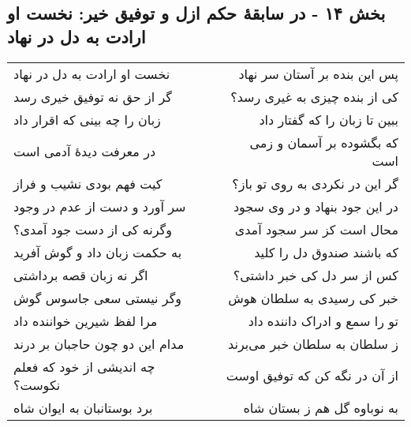 \begin{center}
\section*{بخش ۱۴ - در سابقهٔ حکم ازل و توفیق خیر: نخست او ارادت به دل در نهاد}
\label{sec:014}
\begin{longtable}{l p{0.5cm} r}
نخست او ارادت به دل در نهاد
&&
پس این بنده بر آستان سر نهاد
\\
گر از حق نه توفیق خیری رسد
&&
کی از بنده چیزی به غیری رسد؟
\\
زبان را چه بینی که اقرار داد
&&
ببین تا زبان را که گفتار داد
\\
در معرفت دیدهٔ آدمی است
&&
که بگشوده بر آسمان و زمی است
\\
کیت فهم بودی نشیب و فراز
&&
گر این در نکردی به روی تو باز؟
\\
سر آورد و دست از عدم در وجود
&&
در این جود بنهاد و در وی سجود
\\
وگرنه کی از دست جود آمدی؟
&&
محال است کز سر سجود آمدی
\\
به حکمت زبان داد و گوش آفرید
&&
که باشند صندوق دل را کلید
\\
اگر نه زبان قصه برداشتی
&&
کس از سر دل کی خبر داشتی؟
\\
وگر نیستی سعی جاسوس گوش
&&
خبر کی رسیدی به سلطان هوش
\\
مرا لفظ شیرین خواننده داد
&&
تو را سمع و ادراک داننده داد
\\
مدام این دو چون حاجبان بر درند
&&
ز سلطان به سلطان خبر می‌برند
\\
چه اندیشی از خود که فعلم نکوست؟
&&
از آن در نگه کن که توفیق اوست
\\
برد بوستانبان به ایوان شاه
&&
به نوباوه گل هم ز بستان شاه
\\
\end{longtable}
\end{center}
